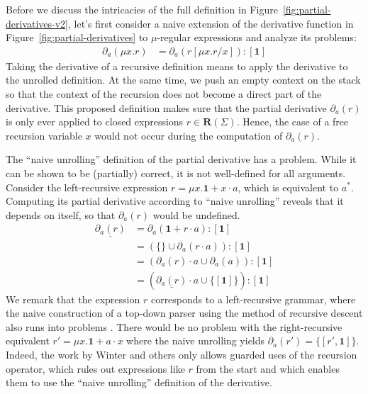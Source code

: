 \documentclass[runningheads, envcountsame, a4paper]{llncs}
\newcommand\pderiv[3][{}]{\partial^{#1}_{#3}(#2)}
\newcommand\Rempty{\mathbf1}
\newcommand\Reg{\mathbf{R}}
\newcommand\PUSH{:}
\newcommand\SINGLETON[1]{{[#1]}}
\begin{document}
Before we discuss the intricacies of the full definition in 
Figure~\ref{fig:partial-derivatives-v2}, let's first consider a naive
extension of the derivative function in
Figure~\ref{fig:partial-derivatives} to $\mu$-regular expressions
and analyze its problems: 
\begin{align*}
  \pderiv{\mu x.r}{a} &= \pderiv{r[\mu x.r/x]}{a} \PUSH \SINGLETON{\Rempty}
                        \tag{naive unrolling: to be revised}
\end{align*}
Taking the derivative of a recursive definition means to apply the derivative to the unrolled
definition. At the same time, we push an empty context on the stack so that the context of the
recursion does not become a direct part of the derivative. This
proposed definition makes sure that the partial derivative
$\pderiv{r}{a}$ is only ever applied to closed expressions $r\in \Reg (\Sigma)$. Hence, the case of a
free recursion variable $x$ would not occur during the computation of $\pderiv{r}{a}$.

\begin{example}\label{example:left-recursion}
The ``naive unrolling'' definition of the partial derivative has a problem. While it can be shown to
be (partially) correct, it is not well-defined for all
arguments. Consider the left-recursive expression $r = \mu x. \Rempty + x \cdot a$,
which is 
equivalent to $a^*$. Computing its partial derivative according to
``naive unrolling'' reveals that it depends on itself, so that
$\pderiv{r}a$ would be undefined.
\begin{align*}
  \underline{\pderiv{r}{a}}
  &= \pderiv{\Rempty + r \cdot a}{a}  \PUSH  \SINGLETON{\Rempty} \\
  &= (\{\} \cup \pderiv{r \cdot a}{a}) \PUSH \SINGLETON{\Rempty} \\
  &= (\pderiv{r}{a} \cdot a \cup \pderiv{a}{a})  \PUSH \SINGLETON{\Rempty} \\
  &= (\underline{\pderiv{r}{a}} \cdot a \cup \{ \SINGLETON\Rempty \}) \PUSH \SINGLETON{\Rempty}
\end{align*}
We remark that the expression $r$
corresponds to a left-recursive grammar, where the naive construction of a top-down parser using the
method of recursive descent also runs into problems
\cite{AhoLamSetiUllman2007}. There would be no problem with the
right-recursive equivalent $r' = \mu x.\Rempty + a\cdot x$ where the
naive unrolling yields $\pderiv{r'}a = \{ [r', \Rempty] \}$.
Indeed, the work by Winter and others \cite{DBLP:conf/calco/WinterBR11} only allows
guarded uses of the recursion operator, which rules out  expressions like
$r$ from the start and which enables them to use the ``naive
unrolling'' definition of the derivative.
\end{example}
\end{document}
